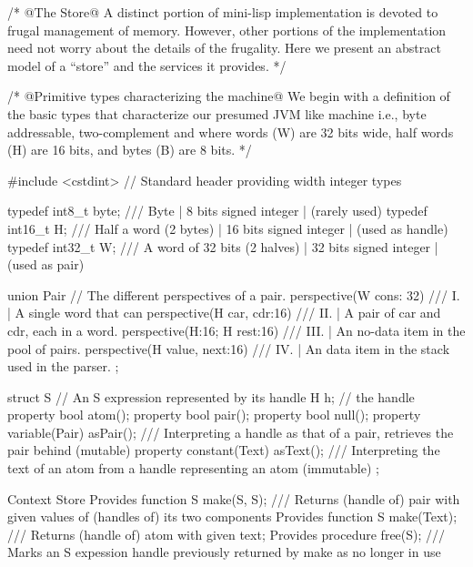 \documentclass[12pt]{article}
\begin{document}
\begin{code}
/* @The Store@ 
A distinct portion of mini-lisp implementation is devoted to frugal management  
of memory. However, other portions of the implementation need not worry about
the details of the frugality. Here we present an abstract model of a 
``store'' and the services it provides. */ 
\end{code}

\begin{code}
/* @Primitive types characterizing the machine@ 
We begin with a  definition  of the basic types that characterize our presumed 
JVM like machine i.e., byte addressable, two-complement and where words (W) are 
32 bits wide, half words (H) are 16 bits, and bytes (B) are 8 bits. */

#include <cstdint> // Standard header providing width integer types 

typedef int8_t   byte; /// Byte                         | 8 bits signed integer  | (rarely used)
typedef int16_t  H;    /// Half a word (2 bytes)        | 16 bits signed integer | (used as handle) 
typedef int32_t  W;    /// A word of 32 bits (2 halves) | 32 bits signed integer | (used as pair) 
\end{code}

\begin{code}

union Pair { // The different perspectives of a pair.
  perspective(W cons: 32)        /// I.   | A single word that can 
  perspective(H car, cdr:16)     /// II.  | A pair of car and cdr, each in a word.
  perspective(H:16; H rest:16)   /// III. | An no-data item in the pool of pairs. 
  perspective(H value, next:16)   /// IV.  | An data item in the stack used in the parser. 
};
\end{code}

\begin{code}
struct S { // An S expression represented by its handle
  H h; // the handle
  property bool atom(); 
  property bool pair();
  property bool null();  
  property variable(Pair) asPair(); /// Interpreting a handle as that of a pair, retrieves the pair behind (mutable)  
  property constant(Text) asText(); /// Interpreting the text of an atom from a handle representing an atom (immutable) 
};


Context Store {
  Provides function S make(S, S);           /// Returns (handle of) pair with given values of (handles of) its two components
  Provides function S make(Text);           /// Returns (handle of) atom with given text; 
  Provides procedure free(S);               /// Marks an S expession handle previously returned by make as no longer in use 
}
\end{code}
\end{document}
